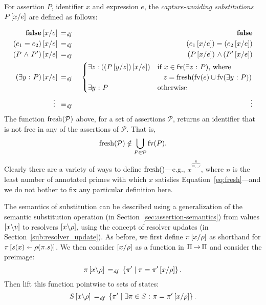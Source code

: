 \documentclass[11pt]{report}
\begin{document}
For assertion $P$, identifier $x$ and expression $e$,
the \emph{capture-avoiding substitutions} $P \left[x / e\right]$ are defined
as follows: 

\begin{eqnarray*}
  \mathbf{false}\left[x / e\right] & \operatorname{\;=_{\mathit{df}}\;} & \mathbf{false}\\
  (e_1 = e_2)\left[x / e\right] & \operatorname{\;=_{\mathit{df}}\;} & (e_1\left[x / e\right]) = (e_2\left[x / e\right])\\
  (P \operatorname{\,\wedge\,} P')\left[x / e\right] & \operatorname{\;=_{\mathit{df}}\;} & (P\left[x / e\right]) \operatorname{\,\wedge\,} (P' \left[x / e\right]) \\
  (\exists y \operatorname{\,:\,} {P})\left[x / e\right] & \operatorname{\;=_{\mathit{df}}\;} &
  \begin{cases}
    \exists z \operatorname{\,:\,} ((P\left[y / z\right])\left[x / e\right]) & \text{if $x \in
    \mathrm{fv}(\exists z \operatorname{\,:\,} P)$, where} \\
	&  \text{\ensuremath{\;\;\;}$z = \mathrm{fresh}(\mathrm{fv}(e) \cup \mathrm{fv}(\exists y \operatorname{\,:\,} P))$}\\
    \exists y \operatorname{\,:\,} P & \text{otherwise}\\
  \end{cases}\\
  \vdots~ & \operatorname{\;=_{\mathit{df}}\;} & ~\vdots
\end{eqnarray*}
The function $\mathrm{fresh}(\mathcal{P})$ above, for a set of assertions $\mathcal{P}$, returns an identifier that is not free in any of the assertions of $\mathcal{P}$. That is, \begin{equation}\label{eq:fresh} \mathrm{fresh}(\mathcal{P}) \notin \bigcup_{P \in \mathcal{P}} \mathrm{fv}(P).\end{equation} Clearly there are a variety of ways to define $\mathrm{fresh}()$---e.g., $x^{\overbrace{'''\cdots'}^{n}}$, where $n$ is the least number of annotated primes with which $x$ satisfies Equation~\ref{eq:fresh}---and we do not bother to fix any particular definition here.

The semantics of substitution can be described using a generalization of the semantic substitution operation (in Section~\ref{sec:assertion-semantics}) from values $\left[x \backslash v\right]$ to resolvers $\left[x \backslash \rho\right]$, using the concept of resolver updates (in Section~\ref{sub:resolver_update}). As before, we first define $\pi \left[x / \rho\right]$ as shorthand for $\pi \left[ s(x) \shortleftarrow \rho(\pi.s) \right]$. We then consider $\left[x / \rho\right]$ as a function in $\Pi \operatorname{\rightarrow} \Pi$ and consider the preimage: \[ \pi \left[x \backslash \rho\right] \operatorname{\;=_{\mathit{df}}\;} \left\lbrace \pi' \mid \pi = \pi'\left[x / \rho\right] \right\rbrace.\] Then lift this function pointwise to sets of states: \[ S \left[x \backslash \rho\right] \operatorname{\;=_{\mathit{df}}\;} \left\lbrace \pi' \mid \exists \pi \in S \operatorname{\,:\,} \pi = \pi'\left[x / \rho\right] \right\rbrace.\]
\end{document}
